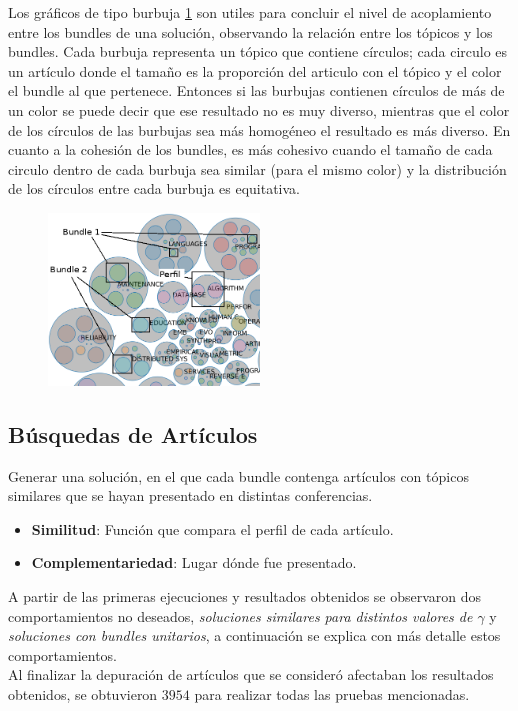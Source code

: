 Los gráficos de tipo burbuja \ref{res:img-explain-bubbles} son utiles para concluir el nivel de acoplamiento entre los bundles de una solución, observando la relación entre los tópicos y los bundles. Cada burbuja representa un tópico que contiene círculos; cada circulo es un artículo donde el tamaño es la proporción del articulo con el tópico y el color el bundle al que pertenece. Entonces si las burbujas contienen círculos de más de un color se puede decir que ese resultado no es muy diverso, mientras que el color de los círculos de las burbujas sea más homogéneo el resultado es más diverso. En cuanto a la cohesión de los bundles, es más cohesivo cuando el tamaño de cada circulo dentro de cada burbuja sea similar (para el mismo color) y la distribución de los círculos entre cada burbuja es equitativa.

\begin{figure}[H]
  \centering
    \includegraphics[width=0.5\textwidth]{img/explain-bubbles.png}
  \caption{}
  \label{res:img-explain-bubbles}
\end{figure}



\subsection{Búsquedas de Artículos}\label{res:busPaper}
Generar una solución, en el que cada bundle contenga artículos con tópicos similares que se hayan presentado en distintas conferencias.\\
\begin{itemize}
  \item \textbf{Similitud}: Función que compara el perfil de cada artículo.
  \item \textbf{Complementariedad}: Lugar dónde fue presentado.
\end{itemize}

A partir de las primeras ejecuciones y resultados obtenidos se observaron dos comportamientos no deseados, \textit{soluciones similares para distintos valores de $\gamma$} y \textit{soluciones con bundles unitarios}, a continuación se explica con más detalle estos comportamientos.\\
Al finalizar la depuración de artículos que se consideró afectaban los resultados obtenidos, se obtuvieron $3954$ para realizar todas las pruebas mencionadas.
